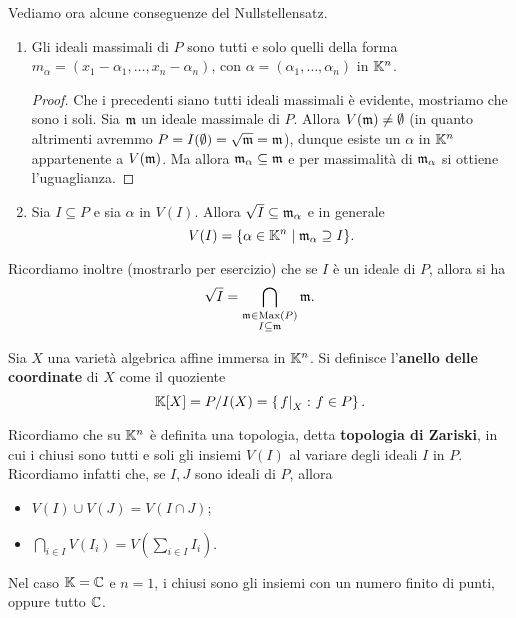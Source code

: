 \medskip 
Vediamo ora alcune conseguenze del Nullstellensatz.
\begin{enumerate}
    \item Gli ideali massimali di $P$ sono tutti e solo quelli della forma $m_\alpha=(x_1-\alpha_1,\dots,x_n-\alpha_n)$, con $\alpha=(\alpha_1,\dots,\alpha_n)$ in $\mathbb{K}^n$.
    \begin{proof}
        Che i precedenti siano tutti ideali massimali è evidente, mostriamo che sono i soli. Sia $\mathfrak{m}$ un ideale massimale di $P$. Allora $V(\mathfrak{m})\ne\emptyset$ (in quanto altrimenti avremmo $P=I(\emptyset)=\sqrt{\mathfrak{m}}=\mathfrak{m}$), dunque esiste un $\alpha$ in $\mathbb{K}^n$ appartenente a $V(\mathfrak{m})$. Ma allora $\mathfrak{m}_\alpha\subseteq \mathfrak{m}$ e per massimalità di $\mathfrak{m}_\alpha$ si ottiene l'uguaglianza. \end{proof}

        \item Sia $I\subseteq P$ e sia $\alpha$ in $V(I)$. Allora $\sqrt{I}\subseteq \mathfrak{m}_\alpha$ e in generale \[V(I)=\{\alpha\in \mathbb{K}^n \mid \mathfrak{m}_\alpha \supseteq I\}.\]    
\end{enumerate} 
Ricordiamo inoltre (mostrarlo per esercizio) che se $I$ è un ideale di $P$, allora si ha \[\sqrt{I}=\bigcap_{\substack{\mathfrak{m} \in \operatorname{Max}(P) \\ I\subseteq \mathfrak{m}}} \mathfrak{m} .\]


\begin{definition}
    Sia $X$ una varietà algebrica affine immersa in $\mathbb{K}^n$. Si definisce l'\textbf{anello delle coordinate} di $X$ come il quoziente \[\mathbb{K}[X]= P/I(X)=\left\{\left.f\right|_{X} \colon f\in P\right\}.\] %
\end{definition}

Ricordiamo che su $\mathbb{K}^n$ è definita una topologia, detta \textbf{topologia di Zariski}, in cui i chiusi sono tutti e soli gli insiemi $V(I)$ al variare degli ideali $I$ in $P$. Ricordiamo infatti che, se $I,J$ sono ideali di $P$, allora \begin{itemize}
    \item $V(I)\cup V(J)=V(I\cap J)$;
    \item $\bigcap_{i\in I} V(I_i)=V\left(\sum_{i\in I}I_i\right)$.
\end{itemize}

\begin{example}
    Nel caso $\mathbb{K}=\mathbb{C}$ e $n=1$, i chiusi sono gli insiemi con un numero finito di punti, oppure tutto $\mathbb{C}$.
\end{example}


